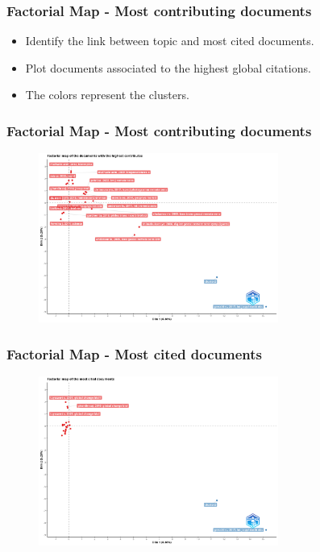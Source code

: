 \documentclass[aspectratio=169]{beamer}
\begin{document}
\begin{frame}
	\frametitle{Factorial Map - Most contributing documents}
	\begin{itemize}
		\item Identify the link between topic and most cited documents.
		\item Plot documents associated to the highest global citations.
		\item The colors represent the clusters.
	\end{itemize}
\end{frame}

\begin{frame}
	\frametitle{Factorial Map - Most contributing documents}
	\begin{figure}
		\centering
		\includegraphics[width=0.7\textwidth]{figures/con_stru_map_contrib.png}
	\end{figure}
\end{frame}

\begin{frame}
	\frametitle{Factorial Map - Most cited documents}
	\begin{figure}
		\centering
		\includegraphics[width=0.7\textwidth]{figures/con_stru_map_cited.png}
	\end{figure}
\end{frame}
\end{document}
